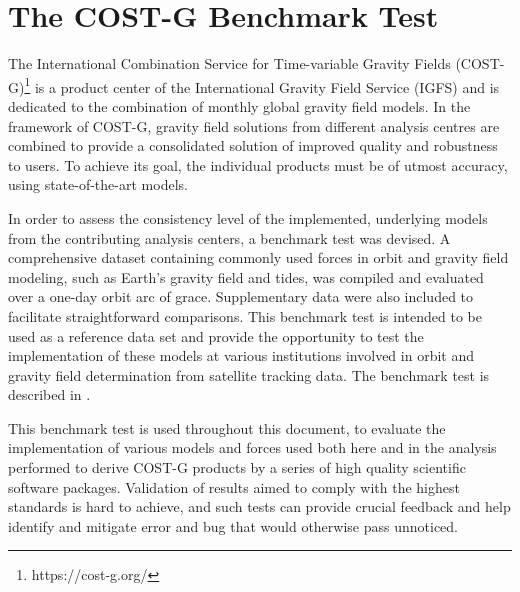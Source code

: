 \section{The COST-G Benchmark Test}\label{sec:costg-benchmark-test}

The International Combination Service for Time-variable Gravity Fields (COST-G)\footnote{https://cost-g.org/} 
is a product center of the International Gravity Field Service (IGFS) and is dedicated 
to the combination of monthly global gravity field models. In the framework of 
COST-G, gravity field solutions from different analysis centres are combined to 
provide a consolidated solution of improved quality and robustness to users. To 
achieve its goal, the individual products must be of utmost accuracy, using 
state-of-the-art models. 

In order to assess the consistency level of the implemented, underlying models 
from the contributing analysis centers, a benchmark test was devised. 
A comprehensive dataset containing commonly used forces in orbit and gravity 
field modeling, such as Earth's gravity field and tides, was compiled and 
evaluated over a one-day orbit arc of \gls{grace}. Supplementary data were also 
included to facilitate straightforward comparisons. This benchmark test is 
intended to be used as a reference data set and provide the opportunity to test the 
implementation of these models at various institutions involved in orbit and 
gravity field determination from satellite tracking data. The benchmark test is 
described in \cite{Lasser2020}.

This benchmark test is used throughout this document, to evaluate the implementation 
of various models and forces used both here and in the analysis performed to 
derive COST-G products by a series of high quality scientific software packages. Validation of results aimed to comply with the highest standards is hard to achieve, and such 
tests can provide crucial feedback and help identify and mitigate error and bug that would otherwise pass unnoticed.
